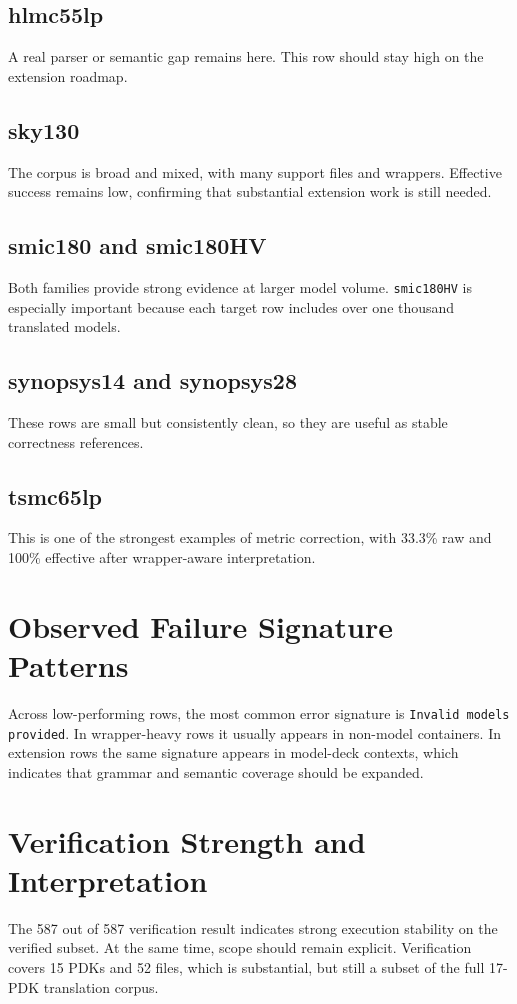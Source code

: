 \documentclass[12pt,a4paper,oneside]{report}
\begin{document}
\subsection{hlmc55lp}
A real parser or semantic gap remains here. This row should stay high on the extension roadmap.

\subsection{sky130}
The corpus is broad and mixed, with many support files and wrappers. Effective success remains low, confirming that substantial extension work is still needed.

\subsection{smic180 and smic180HV}
Both families provide strong evidence at larger model volume. \texttt{smic180HV} is especially important because each target row includes over one thousand translated models.

\subsection{synopsys14 and synopsys28}
These rows are small but consistently clean, so they are useful as stable correctness references.

\subsection{tsmc65lp}
This is one of the strongest examples of metric correction, with 33.3\% raw and 100\% effective after wrapper-aware interpretation.

\section{Observed Failure Signature Patterns}
Across low-performing rows, the most common error signature is \texttt{Invalid models provided}. In wrapper-heavy rows it usually appears in non-model containers. In extension rows the same signature appears in model-deck contexts, which indicates that grammar and semantic coverage should be expanded.

\section{Verification Strength and Interpretation}
The 587 out of 587 verification result indicates strong execution stability on the verified subset. At the same time, scope should remain explicit. Verification covers 15 PDKs and 52 files, which is substantial, but still a subset of the full 17-PDK translation corpus.
\end{document}
